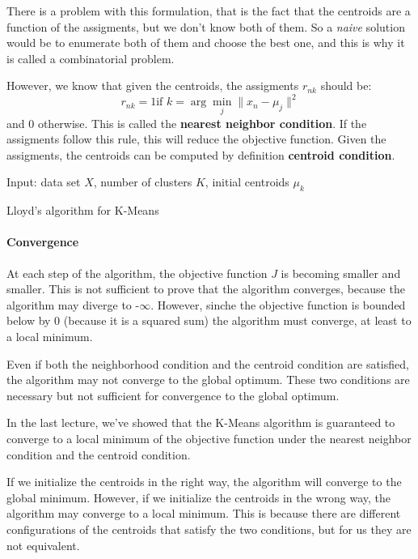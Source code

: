 There is a problem with this formulation, that is the fact that the centroids are a function of the assigments, but we don't know both of them. So a \textit{naive} solution would be to enumerate both of them and choose the best one, and this is why it is called a combinatorial problem.

However, we know that given the centroids, the assigments $r_{nk}$ should be:
\[
    r_{nk} = 1 \text{if } k = \arg\min_{j} \|x_n - \mu_j\|^2
\]
and $0$ otherwise. This is called the \textbf{nearest neighbor condition}. If the assigments follow this rule, this will reduce the objective function. Given the assigments, the centroids can be computed by definition \textbf{centroid condition}.

\begin{algorithm}
    \SetAlgoLined
    Input: data set $X$, number of clusters $K$, initial centroids $\mu_k$ \\
    \caption{Lloyd's algorithm for K-Means}
\end{algorithm}


\paragraph*{Convergence}
At each step of the algorithm, the objective function $J$ is becoming smaller and smaller. This is not sufficient to prove that the algorithm converges, because the algorithm may diverge to -$\infty$. However, sinche the objective function is bounded below by $0$ (because it is a squared sum) the algorithm must converge, at least to a local minimum.

Even if both the neighborhood condition and the centroid condition are satisfied, the algorithm may not converge to the global optimum. These two conditions are necessary but not sufficient for convergence to the global optimum.



In the last lecture, we've showed that the K-Means algorithm is guaranteed to converge to a local minimum of the objective function under the nearest neighbor condition and the centroid condition.

If we initialize the centroids in the right way, the algorithm will converge to the global minimum. However, if we initialize the centroids in the wrong way, the algorithm may converge to a local minimum. This is because there are different configurations of the centroids that satisfy the two conditions, but for us they are not equivalent.

